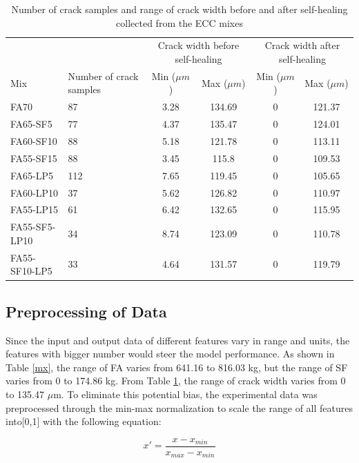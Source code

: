 \documentclass[11pt]{article}
\begin{document}
	\begin{table}[!h]
		\centering
		\caption{Number of crack samples and range of crack width before and after self-healing collected from the ECC mixes}
		\label{min}
		\begin{tabular}{p{1.02in}p{1.2in}cccc}
			\toprule
			&		&	\multicolumn{2}{p{1.9in}}{Crack width before self-healing}	&	\multicolumn{2}{p{1.8in}}{Crack width after self-healing}	\\ \cmidrule(r){3-6}
			Mix	&	Number of crack samples	&	Min	($\mu m$) &	Max ($\mu m$)	&	Min ($\mu m$)	&	Max ($\mu m$)	\\
			\midrule
			FA70	&	87	&	3.28	&	134.69	&	0	&	121.37	\\
			FA65-SF5	&	77	&	4.37	&	135.47	&	0	&	124.01	\\
			FA60-SF10	&	88	&	5.18	&	121.78	&	0	&	113.11	\\
			FA55-SF15	&	88	&	3.45	&	115.8	&	0	&	109.53	\\
			FA65-LP5	&	112	&	7.65	&	119.45	&	0	&	105.65	\\
			FA60-LP10	&	37	&	5.62	&	126.82	&	0	&	110.97	\\
			FA55-LP15	&	61	&	6.42	&	132.65	&	0	&	115.95	\\
			FA55-SF5-LP10	&	34	&	8.74	&	123.09	&	0	&	110.78	\\
			FA55-SF10-LP5	&	33	&	4.64	&	131.57	&	0	&	119.79	\\
			\bottomrule
		\end{tabular}
	\end{table}
	

	
	\subsection{Preprocessing of Data}
	
	Since the input and output data of different features vary in range and units, the features with bigger number would steer the model performance. As shown in Table \ref{mx}, the range of FA varies from 641.16 to 816.03 kg, but the range of SF varies from 0 to 174.86 kg. From Table \ref{min}, the range of crack width varies from 0 to 135.47 $\mu$m. To eliminate this potential bias, the experimental data was preprocessed through the min-max normalization to scale the range of all features into[0,1] with the following equation: 
	
	\begin{equation}
	x' = \frac{x - x_{min}}{x_{max} - x_{min}}
	\end{equation}
	
\end{document}
